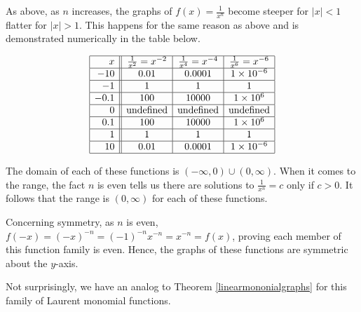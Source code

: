 \documentclass{ximera}
\begin{document}
As above, as $n$ increases, the graphs of $f(x) = \frac{1}{x^{n}}$ become steeper for $|x|<1$ flatter for  $|x|>1$.  This happens for the same reason as above and is demonstrated numerically in the table below.

\[\begin{array}{|r||c|c|c|}  \hline
x &  \frac{1}{x^2} = x^{-2} & \frac{1}{x^4} = x^{-4} & \frac{1}{x^6} = x^{-6} \\ \hline
 -10 &0.01 &0.0001& 1 \times 10^{-6}  \\  \hline
 -1 & 1 & 1&  1\\  \hline
 -0.1 & 100 & 10000 &  1 \times 10^{6} \\  \hline
 0 &  \text{undefined} &  \text{undefined}  &  \text{undefined}  \\  \hline
0.1 & 100 & 10000 &  1 \times 10^{6} \\  \hline
 1&  1 & 1&  1 \\  \hline
10 &0.01 &0.0001& 1 \times 10^{-6}  \\  \hline 
\end{array}\]


The domain of each of these functions is $(-\infty, 0) \cup (0, \infty)$.  When it comes to the range, the fact $n$ is even tells us there are  solutions to $\frac{1}{x^n} = c$ only if $c>0$. It follows that the range is $(0, \infty)$ for each of these functions.  

Concerning symmetry, as $n$ is even, $f(-x) = (-x)^{-n} = (-1)^{-n} x^{-n} = x^{-n} = f(x)$, proving each member of this function family is even.  Hence,  the graphs of these functions are symmetric about the $y$-axis.

Not surprisingly, we have an analog to Theorem \ref{linearmononialgraphs} for this family of Laurent monomial functions.

\end{document}

